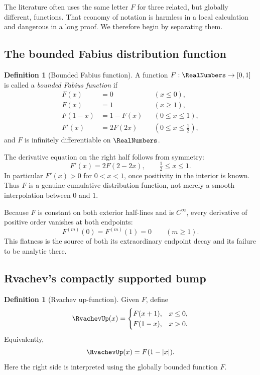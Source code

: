 \documentclass[11pt,oneside]{article}
\theoremstyle{definition}
\newtheorem{definition}[theorem]{Definition}
\theoremstyle{remark}
\begin{document}
The literature often uses the same letter $F$ for three related, but globally different,
functions.  That economy of notation is harmless in a local calculation and dangerous in a
long proof.  We therefore begin by separating them.

\subsection{The bounded Fabius distribution function}

\begin{definition}[Bounded Fabius function]
A function $F:\RealNumbers\to[0,1]$ is called a \emph{bounded Fabius function} if
\begin{align}
 F(x)&=0 &&(x\le 0), \label{eq:F-left}\\
 F(x)&=1 &&(x\ge 1), \label{eq:F-right}\\
 F(1-x)&=1-F(x) &&(0\le x\le 1), \label{eq:F-symmetry}\\
 F'(x)&=2F(2x) &&(0\le x\le \tfrac12), \label{eq:F-diffeq}
\end{align}
and $F$ is infinitely differentiable on $\RealNumbers$.
\end{definition}

The derivative equation on the right half follows from symmetry:
\begin{equation}
 F'(x)=2F(2-2x),\qquad \tfrac12\le x\le 1.                 \label{eq:F-diffeq-right}
\end{equation}
In particular $F'(x)>0$ for $0<x<1$, once positivity in the interior is known.  Thus $F$
is a genuine cumulative distribution function, not merely a smooth interpolation between
$0$ and $1$.

Because $F$ is constant on both exterior half-lines and is $C^\infty$, every derivative of
positive order vanishes at both endpoints:
\begin{equation}
 F^{(m)}(0)=F^{(m)}(1)=0\qquad(m\ge1).                    \label{eq:flat-endpoints}
\end{equation}
This flatness is the source of both its extraordinary endpoint decay and its failure to be
analytic there.

\subsection{Rvachev's compactly supported bump}

\begin{definition}[Rvachev up-function]
Given $F$, define
\begin{equation}
 \RvachevUp(x)=
 \begin{cases}
   F(x+1),&x\le0,\\
   F(1-x),&x>0.
 \end{cases}                                               \label{eq:up-fold}
\end{equation}
Equivalently,
\begin{equation}
 \RvachevUp(x)=F(1-|x|).                                          \label{eq:up-absolute}
\end{equation}
Here the right side is interpreted using the globally bounded function $F$.
\end{definition}
\end{document}
